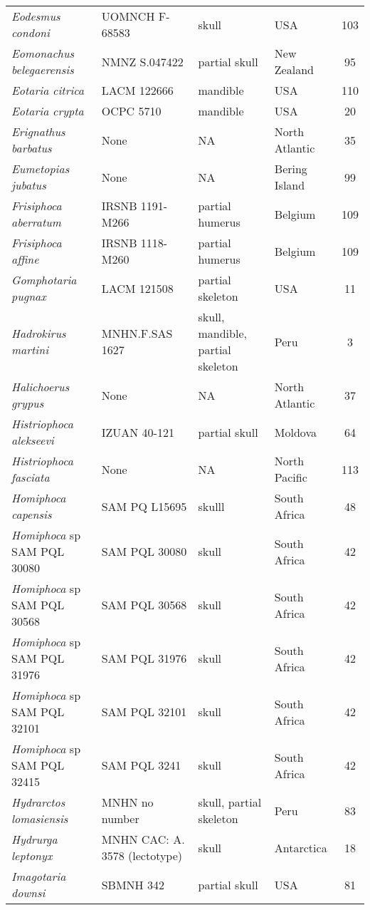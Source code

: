 \begin{longtable}{p{}p{}p{}lc}
\textit{Eodesmus condoni} &	UOMNCH F-68583 & 	skull & 	USA & 103\\
\textit{Eomonachus belegaerensis} &	NMNZ S.047422 & 	partial skull & 	New Zealand & 95\\
\textit{Eotaria citrica} &	LACM 122666 & 	mandible & 	USA & 110\\
\textit{Eotaria crypta} &	OCPC 5710 & 	mandible & 	USA & 20\\
\textit{Erignathus barbatus} &	None & 	NA & 	North Atlantic & 35\\
\textit{Eumetopias jubatus} &	None & 	NA & 	Bering Island & 99\\
\textit{Frisiphoca aberratum} &	IRSNB 1191-M266 & 	partial humerus & 	Belgium & 109\\
\textit{Frisiphoca affine} &	IRSNB 1118-M260 & 	partial humerus & 	Belgium & 109\\
\textit{Gomphotaria pugnax} &	LACM 121508 & 	partial skeleton & 	USA & 11\\
\textit{Hadrokirus martini} &	MNHN.F.SAS 1627 & 	skull, mandible, partial skeleton & 	Peru & 3\\
\textit{Halichoerus grypus} &	None & 	NA & 	North Atlantic & 37\\
\textit{Histriophoca alekseevi} & IZUAN 40-121	& partial skull	& Moldova & 64\\
\textit{Histriophoca fasciata} &	None & 	NA & 	North Pacific & 113\\
\textit{Homiphoca capensis} &	SAM PQ L15695 & 	skulll & 	South Africa & 48\\
\textit{Homiphoca} sp SAM PQL 30080	& SAM PQL 30080 & 	skull & 	South Africa & 42\\
\textit{Homiphoca} sp SAM PQL 30568	& SAM PQL 30568 & 	skull & 	South Africa & 42\\
\textit{Homiphoca} sp SAM PQL 31976	& SAM PQL 31976 & 	skull & 	South Africa & 42\\
\textit{Homiphoca} sp SAM PQL 32101	& SAM PQL 32101 & 	skull & 	South Africa & 42\\
\textit{Homiphoca} sp SAM PQL 32415	& SAM PQL 3241 & 	  skull & 	South Africa & 42\\
\textit{Hydrarctos lomasiensis} &	MNHN no number & 	skull, partial skeleton & 	Peru & 83\\
\textit{Hydrurga leptonyx} &	MNHN CAC: A. 3578 (lectotype) & 	skull & 	Antarctica & 18\\
\textit{Imagotaria downsi} &	SBMNH 342 & 	partial skull & 	USA & 81\\

\end{longtable}
